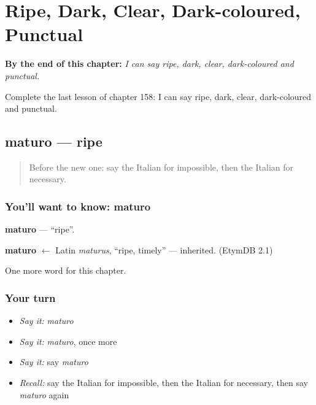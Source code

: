 
\chapter{Ripe, Dark, Clear, Dark-coloured, Punctual}
\label{ch:it-ripe-dark-clear-dark-coloured-punctual}

\begin{chapteropening}
\textbf{By the end of this chapter:} \emph{I can say ripe, dark, clear, dark-coloured and punctual.}

Complete the last lesson of chapter 158: I can say ripe, dark, clear, dark-coloured and punctual.
\end{chapteropening}

\section[maturo]{maturo — ripe}

\label{lesson:IT-C158-maturo}



\begin{quote}
Before the new one: say the Italian for impossible, then the Italian for necessary.
\end{quote}

\subsection*{You'll want to know: maturo}
\textbf{maturo} — \textquotedblleft{}ripe\textquotedblright{}.

\begin{cousinweb}
\textbf{maturo} $\leftarrow$ Latin \emph{maturus}, \textquotedblleft{}ripe, timely\textquotedblright{} — inherited. (EtymDB 2.1)
\end{cousinweb}

\begin{grammarlens}[title={What you've built}]
One more word for this chapter.
\end{grammarlens}

\subsection*{Your turn}
\begin{itemize}
\raggedright
  \item \emph{Say it:} \emph{maturo}
  \item \emph{Say it:} \emph{maturo}, once more
  \item \emph{Say it:} say \emph{maturo}
  \item \emph{Recall:} say the Italian for impossible, then the Italian for necessary, then say \emph{maturo} again
\end{itemize}

